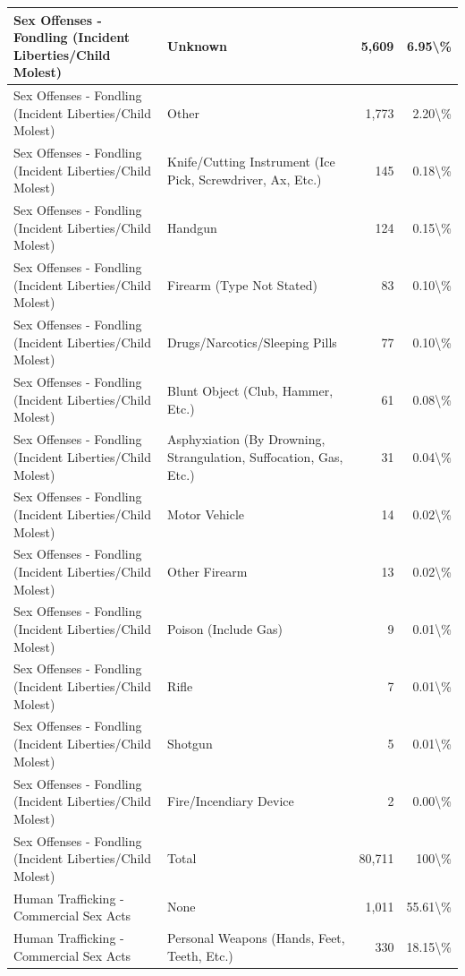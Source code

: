 \documentclass[
]{krantz}
\begin{document}
\begin{longtable}[t]{l|l|r|r}
Sex Offenses - Fondling (Incident Liberties/Child Molest) & Unknown & 5,609 & 6.95\textbackslash{}\%\\
\hline
Sex Offenses - Fondling (Incident Liberties/Child Molest) & Other & 1,773 & 2.20\textbackslash{}\%\\
\hline
Sex Offenses - Fondling (Incident Liberties/Child Molest) & Knife/Cutting Instrument (Ice Pick, Screwdriver, Ax, Etc.) & 145 & 0.18\textbackslash{}\%\\
\hline
Sex Offenses - Fondling (Incident Liberties/Child Molest) & Handgun & 124 & 0.15\textbackslash{}\%\\
\hline
Sex Offenses - Fondling (Incident Liberties/Child Molest) & Firearm (Type Not Stated) & 83 & 0.10\textbackslash{}\%\\
\hline
Sex Offenses - Fondling (Incident Liberties/Child Molest) & Drugs/Narcotics/Sleeping Pills & 77 & 0.10\textbackslash{}\%\\
\hline
Sex Offenses - Fondling (Incident Liberties/Child Molest) & Blunt Object (Club, Hammer, Etc.) & 61 & 0.08\textbackslash{}\%\\
\hline
Sex Offenses - Fondling (Incident Liberties/Child Molest) & Asphyxiation (By Drowning, Strangulation, Suffocation, Gas, Etc.) & 31 & 0.04\textbackslash{}\%\\
\hline
Sex Offenses - Fondling (Incident Liberties/Child Molest) & Motor Vehicle & 14 & 0.02\textbackslash{}\%\\
\hline
Sex Offenses - Fondling (Incident Liberties/Child Molest) & Other Firearm & 13 & 0.02\textbackslash{}\%\\
\hline
Sex Offenses - Fondling (Incident Liberties/Child Molest) & Poison (Include Gas) & 9 & 0.01\textbackslash{}\%\\
\hline
Sex Offenses - Fondling (Incident Liberties/Child Molest) & Rifle & 7 & 0.01\textbackslash{}\%\\
\hline
Sex Offenses - Fondling (Incident Liberties/Child Molest) & Shotgun & 5 & 0.01\textbackslash{}\%\\
\hline
Sex Offenses - Fondling (Incident Liberties/Child Molest) & Fire/Incendiary Device & 2 & 0.00\textbackslash{}\%\\
\hline
Sex Offenses - Fondling (Incident Liberties/Child Molest) & Total & 80,711 & 100\textbackslash{}\%\\
\hline
Human Trafficking - Commercial Sex Acts & None & 1,011 & 55.61\textbackslash{}\%\\
\hline
Human Trafficking - Commercial Sex Acts & Personal Weapons (Hands, Feet, Teeth, Etc.) & 330 & 18.15\textbackslash{}\%\\

\end{longtable}
\end{document}
